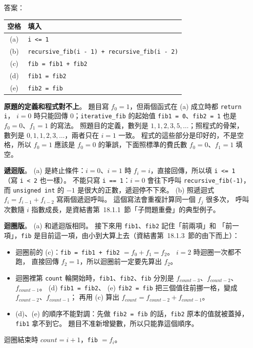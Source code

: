 \begin{pastsoln}
答案：
\begin{center}
\begin{tabular}{cl}
\toprule
空格 & 填入 \\
\midrule
(a) & \texttt{i <= 1} \\
(b) & \texttt{recursive\_fib(i - 1) + recursive\_fib(i - 2)} \\
(c) & \texttt{fib = fib1 + fib2} \\
(d) & \texttt{fib1 = fib2} \\
(e) & \texttt{fib2 = fib} \\
\bottomrule
\end{tabular}
\end{center}

\textbf{原題的定義和程式對不上}。 題目寫 $f_0 = 1$，但兩個函式在 (a) 成立時都 \texttt{return i}，
$i = 0$ 時只能回傳 $0$；\texttt{iterative\_fib} 的起始值 \texttt{fib1 = 0}、\texttt{fib2 = 1}
也是 $f_0 = 0$、$f_1 = 1$ 的寫法。 照題目的定義，數列是 $1, 1, 2, 3, 5, \ldots$；照程式的骨架，
數列是 $0, 1, 1, 2, 3, \ldots$，兩者只在 $i = 1$ 一致。 程式的這些部分是印好的，不是空格，所以 $f_0 = 1$
應該是 $f_0 = 0$ 的筆誤，下面照標準的費氏數 $f_0 = 0$、$f_1 = 1$ 填空。

\textbf{遞迴版}。 (a) 是終止條件：$i = 0$、$i = 1$ 時 $f_i = i$，直接回傳，所以填 \texttt{i <= 1}
（寫 \texttt{i < 2} 也一樣）。 不能只寫 \texttt{i == 1}：$i = 0$ 會往下呼叫
\texttt{recursive\_fib(-1)}，而 \texttt{unsigned int} 的 $-1$ 是很大的正數，遞迴停不下來。
(b) 照遞迴式 $f_i = f_{i-1} + f_{i-2}$ 寫兩個遞迴呼叫。 這個寫法會重複計算同一個 $f_j$ 很多次，
呼叫次數隨 $i$ 指數成長，是資結書第~18.1.1~節「子問題重疊」的典型例子。

\textbf{迴圈版}。 (a) 和遞迴版相同。 接下來用 \texttt{fib1}、\texttt{fib2} 記住「前兩項」和
「前一項」，\texttt{fib} 是目前這一項，由小到大算上去（資結書第~18.1.3~節的由下而上）：
\begin{itemize}
\item 迴圈前的 (c)：\texttt{fib = fib1 + fib2} $= f_0 + f_1 = f_2$。 $i = 2$ 時迴圈一次都不跑，
直接回傳 $f_2 = 1$，所以迴圈前一定要先算出 $f_2$。
\item 迴圈裡第 \texttt{count} 輪開始時，\texttt{fib1}、\texttt{fib2}、\texttt{fib} 分別是
$f_{\mathit{count}-3}$、$f_{\mathit{count}-2}$、$f_{\mathit{count}-1}$。 (d) \texttt{fib1 = fib2}、
(e) \texttt{fib2 = fib} 把三個值往前挪一格，變成 $f_{\mathit{count}-2}$、$f_{\mathit{count}-1}$；
再用 (c) 算出 $f_{\mathit{count}} = f_{\mathit{count}-2} + f_{\mathit{count}-1}$。
\item (d)、(e) 的順序不能對調：先做 \texttt{fib2 = fib} 的話，\texttt{fib2} 原本的值就被蓋掉，
\texttt{fib1} 拿不到它。 題目不准新增變數，所以只能靠這個順序。
\end{itemize}
迴圈結束時 $\mathit{count} = i + 1$，\texttt{fib} $= f_i$。


\end{pastsoln}
